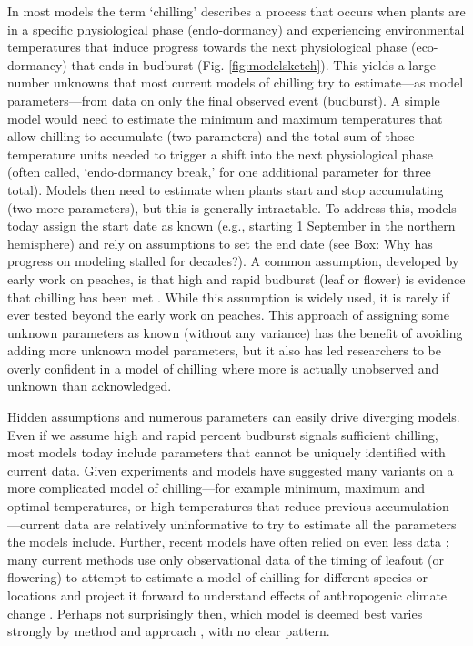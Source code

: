 \documentclass[11pt]{article}
\begin{document}
In most models the term `chilling' describes a process that occurs when plants are in a specific physiological phase (endo-dormancy) and experiencing environmental temperatures that induce progress towards the next physiological phase (eco-dormancy) that ends in budburst (Fig. \ref{fig:modelsketch}). This yields a large number unknowns that most current models of chilling try to estimate---as model parameters---from data on only the final observed event (budburst). A simple model would need to estimate the minimum and maximum temperatures that allow chilling to accumulate (two parameters) and the total sum of those temperature units needed to trigger a shift into the next physiological phase (often called, `endo-dormancy break,' for one additional parameter for three total). Models then need to estimate  when plants start and stop accumulating (two more parameters), but this is generally intractable. To address this, models today assign the start date as known (e.g., starting 1 September in the northern hemisphere) and rely on assumptions to set the end date (see Box: Why has progress on modeling stalled for decades?). A common assumption, developed by early work on peaches, is that high and rapid budburst (leaf or flower) is evidence that chilling has been met \citep[i.e. endo-dormancy has ended][]{erez1971}. While this assumption is widely used, it is rarely if ever tested beyond the early work on peaches. This approach of assigning some unknown parameters as known (without any variance) has the benefit of avoiding adding more unknown model parameters, but it also has led researchers to be overly confident in a model of chilling where more is actually unobserved and unknown than acknowledged. 

Hidden assumptions and numerous parameters can easily drive diverging models. Even if we assume high and rapid percent budburst signals sufficient chilling, most models today include parameters that cannot be uniquely identified with current data.  Given experiments and models have suggested many variants on a more complicated model of chilling---for example minimum, maximum and optimal temperatures, or high temperatures that reduce previous accumulation \citep[Fig. \ref{fig:modelsketch}, and see][]{lued2011,luedeling2012chilling,chuine2016}---current data are relatively uninformative to try to estimate all the parameters the models include. Further, recent models have often relied on even less data \citep{hanninen2019experiments}; many current methods use only observational data of the timing of leafout (or flowering) to attempt to estimate a model of chilling for different species or locations and project it forward to understand effects of anthropogenic climate change \citep{lued2011,luedeling2012chilling,gao2024}. Perhaps not surprisingly then, which model is deemed best varies strongly by method and approach \citep{Caffarra:2011qf,basler2016evaluating,hufkens2018integrated}, with no clear pattern. 
\end{document}
